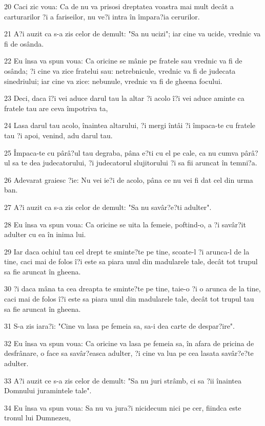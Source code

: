 \par 20 Caci zic voua: Ca de nu va prisosi dreptatea voastra mai mult decât a carturarilor ?i a fariseilor, nu ve?i intra în împara?ia cerurilor.
\par 21 A?i auzit ca s-a zis celor de demult: "Sa nu ucizi"; iar cine va ucide, vrednic va fi de osânda.
\par 22 Eu însa va spun voua: Ca oricine se mânie pe fratele sau vrednic va fi de osânda; ?i cine va zice fratelui sau: netrebnicule, vrednic va fi de judecata sinedriului; iar cine va zice: nebunule, vrednic va fi de gheena focului.
\par 23 Deci, daca î?i vei aduce darul tau la altar ?i acolo î?i vei aduce aminte ca fratele tau are ceva împotriva ta,
\par 24 Lasa darul tau acolo, înaintea altarului, ?i mergi întâi ?i împaca-te cu fratele tau ?i apoi, venind, adu darul tau.
\par 25 Împaca-te cu pârâ?ul tau degraba, pâna e?ti cu el pe cale, ca nu cumva pârâ?ul sa te dea judecatorului, ?i judecatorul slujitorului ?i sa fii aruncat în temni?a.
\par 26 Adevarat graiesc ?ie: Nu vei ie?i de acolo, pâna ce nu vei fi dat cel din urma ban.
\par 27 A?i auzit ca s-a zis celor de demult: "Sa nu savâr?e?ti adulter".
\par 28 Eu însa va spun voua: Ca oricine se uita la femeie, poftind-o, a ?i savâr?it adulter cu ea în inima lui.
\par 29 Iar daca ochiul tau cel drept te sminte?te pe tine, scoate-l ?i arunca-l de la tine, caci mai de folos î?i este sa piara unul din madularele tale, decât tot trupul sa fie aruncat în gheena.
\par 30 ?i daca mâna ta cea dreapta te sminte?te pe tine, taie-o ?i o arunca de la tine, caci mai de folos î?i este sa piara unul din madularele tale, decât tot trupul tau sa fie aruncat în gheena.
\par 31 S-a zis iara?i: "Cine va lasa pe femeia sa, sa-i dea carte de despar?ire".
\par 32 Eu însa va spun voua: Ca oricine va lasa pe femeia sa, în afara de pricina de desfrânare, o face sa savâr?easca adulter, ?i cine va lua pe cea lasata savâr?e?te adulter.
\par 33 A?i auzit ce s-a zis celor de demult: "Sa nu juri strâmb, ci sa ?ii înaintea Domnului juramintele tale".
\par 34 Eu însa va spun voua: Sa nu va jura?i nicidecum nici pe cer, fiindca este tronul lui Dumnezeu,
